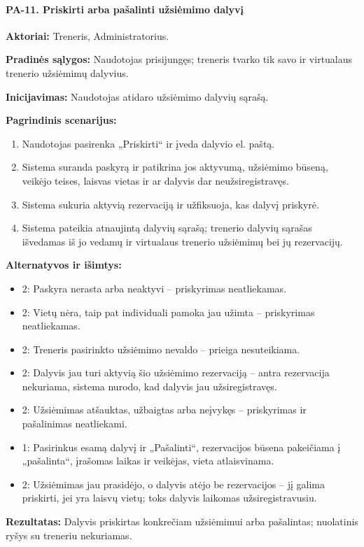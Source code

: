 \paragraph{PA-11. Priskirti arba pašalinti užsiėmimo dalyvį}\mbox{}\par
\textbf{Aktoriai:} Treneris, Administratorius.\par
\textbf{Pradinės sąlygos:} Naudotojas prisijungęs; treneris tvarko tik savo ir virtualaus trenerio užsiėmimų dalyvius.\par
\textbf{Inicijavimas:} Naudotojas atidaro užsiėmimo dalyvių sąrašą.\par
\textbf{Pagrindinis scenarijus:}
\begin{enumerate}
\item Naudotojas pasirenka „Priskirti“ ir įveda dalyvio el. paštą.
\item Sistema suranda paskyrą ir patikrina jos aktyvumą, užsiėmimo būseną, veikėjo teises, laisvas vietas ir ar dalyvis dar neužsiregistravęs.
\item Sistema sukuria aktyvią rezervaciją ir užfiksuoja, kas dalyvį priskyrė.
\item Sistema pateikia atnaujintą dalyvių sąrašą; trenerio dalyvių sąrašas išvedamas iš jo vedamų ir virtualaus trenerio užsiėmimų bei jų rezervacijų.
\end{enumerate}
\textbf{Alternatyvos ir išimtys:}
\begin{itemize}
\item 2: Paskyra nerasta arba neaktyvi -- priskyrimas neatliekamas.
\item 2: Vietų nėra, taip pat individuali pamoka jau užimta -- priskyrimas neatliekamas.
\item 2: Treneris pasirinkto užsiėmimo nevaldo -- prieiga nesuteikiama.
\item 2: Dalyvis jau turi aktyvią šio užsiėmimo rezervaciją -- antra rezervacija nekuriama, sistema nurodo, kad dalyvis jau užsiregistravęs.
\item 2: Užsiėmimas atšauktas, užbaigtas arba neįvykęs -- priskyrimas ir pašalinimas neatliekami.
\item 1: Pasirinkus esamą dalyvį ir „Pašalinti“, rezervacijos būsena pakeičiama į „pašalinta“, įrašomas laikas ir veikėjas, vieta atlaisvinama.
\item 2: Užsiėmimas jau prasidėjo, o dalyvis atėjo be rezervacijos -- jį galima priskirti, jei yra laisvų vietų; toks dalyvis laikomas užsiregistravusiu.
\end{itemize}
\textbf{Rezultatas:} Dalyvis priskirtas konkrečiam užsiėmimui arba pašalintas; nuolatinis ryšys su treneriu nekuriamas.\par
{}
